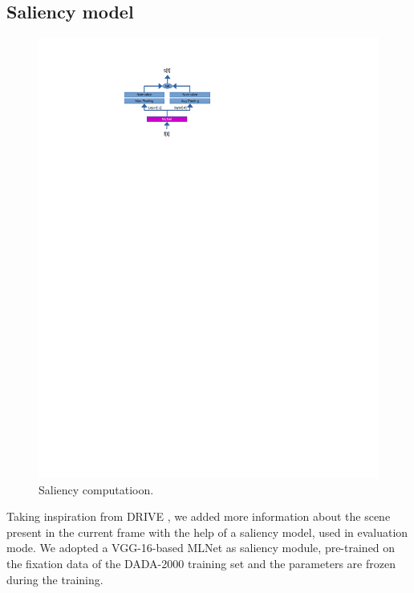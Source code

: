 \subsection{Saliency model}

\begin{figure}[t]
    \centering
        \includegraphics[trim=0 610 150 50, clip, width=1.\linewidth]{images/saliency.pdf}
    \caption{Saliency computatioon.}
    \label{fig:arch-saliency}
\end{figure}

Taking inspiration from DRIVE \cite{bao2021drive}, we added more information about the scene present in the current frame with the help of a saliency model, used in evaluation mode.
We adopted a VGG-16-based MLNet \cite{cornia2016deep} as saliency module, pre-trained on the fixation data of the DADA-2000 \cite{fang2019dada} training set and the parameters are frozen during the training.

